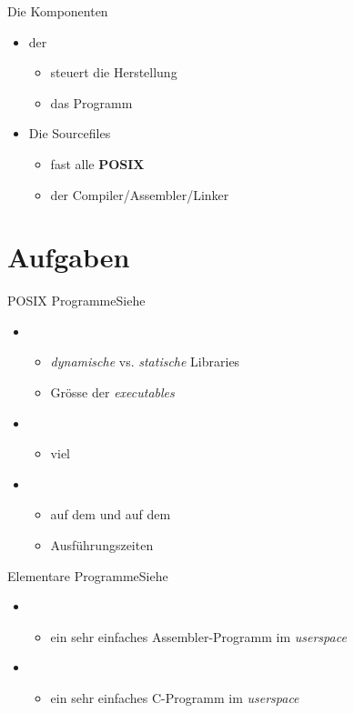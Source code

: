\begin{frame}{Die Komponenten}
 \begin{itemize}
  \item der 
  \begin{itemize}
   \item steuert die Herstellung
   \item das Programm 
  \end{itemize}
  
  \item Die Sourcefiles
  \begin{itemize}
   \item fast alle {\bf POSIX}
   \item der Compiler/Assembler/Linker
  \end{itemize}
 \end{itemize}
\end{frame}

\section{Aufgaben}

\begin{frame}{POSIX Programme}{Siehe }
\begin{itemize}
 \item {}  
 \begin{itemize}
  \item {\em dynamische} vs. {\em statische} Libraries
  \item Grösse der {\em executables}
 \end{itemize}
 \item {}
 \begin{itemize}
  \item viel \cpp
 \end{itemize}
 \item {}
 \begin{itemize}
  \item auf dem \host und auf dem \targetS
  \item Ausführungszeiten
 \end{itemize}
\end{itemize}
\end{frame}

\begin{frame}{Elementare Programme}{Siehe }
 \begin{itemize}
  \item {}
  \begin{itemize}
   \item ein sehr einfaches \linux Assembler-Programm im {\em userspace}
  \end{itemize}
  \item {}
  \begin{itemize}
   \item ein sehr einfaches \linux C-Programm im {\em userspace}
  \end{itemize}
 \end{itemize}
\end{frame}

%
%

